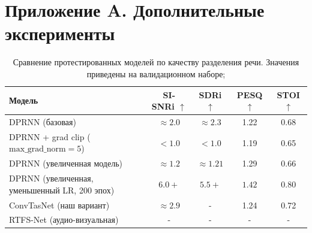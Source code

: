 \documentclass[10pt,conference,compsocconf]{IEEEtran}
\begin{document}
\clearpage
\appendix
\section{Приложение A. Дополнительные эксперименты}
\label{sec:appendix-experiments}
\begin{table}[htbp]
    \centering
    \caption{Сравнение протестированных моделей по качеству разделения речи. 
    Значения приведены на валидационном наборе;}
    \label{tab:models-results}
    \begin{tabular}{lcccc}
        \toprule
        Модель & SI-SNRi $\uparrow$ & SDRi $\uparrow$ & PESQ $\uparrow$ & STOI $\uparrow$ \\
        \midrule
        DPRNN (базовая) 
            & $\approx 2.0$      & $\approx 2.3$     & 1.22 & 0.68 \\
        DPRNN + grad clip ($\text{max\_grad\_norm}=5$) 
            & $< 1.0$            & $< 1.0$           & 1.19 & 0.65 \\
        DPRNN (увеличенная модель) 
            & $\approx 1.2$      & $\approx 1.21$     & 1.29 & 0.66 \\
        DPRNN (увеличенная, уменьшенный LR, 200 эпох) 
            & $\mathbf{6.0+}$    & $\mathbf{5.5+}$   & $\mathbf{1.42}$ & $\mathbf{0.80}$ \\
        ConvTasNet (наш вариант) 
            & $\approx 2.9$    & -   & 1.24& 0.72 \\
        RTFS-Net (аудио-визуальная) 
            & -        & -      & - & - \\
        \bottomrule
    \end{tabular}
\end{table}
\end{document}
